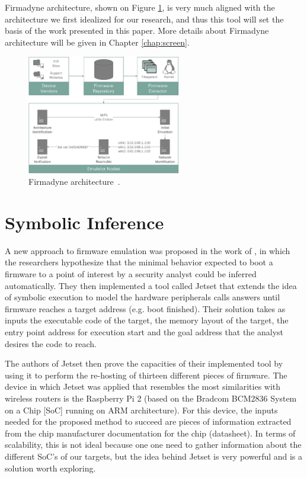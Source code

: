 Firmadyne architecture, shown on Figure \ref{fig:firmadyne}, is very much aligned with the architecture we first idealized for our research, and thus this tool will set the basis of the work presented in this paper. More details about Firmadyne architecture will be given in Chapter \ref{chap:screen}.

\begin{figure}[H]
    \centering
    \includegraphics[width=0.6\textwidth]{figs/firmadyne.png}
    \caption{Firmadyne architecture~\cite{firmadyne}.}
    \label{fig:firmadyne}
\end{figure}

\section{Symbolic Inference}

A new approach to firmware emulation was proposed in the work of \cite{jetset}, in which the researchers hypothesize that the minimal behavior expected to boot a firmware to a point of interest by a security analyst could be inferred automatically. They then implemented a tool called Jetset that extends the idea of symbolic execution to model the hardware peripherals calls answers until firmware reaches a target address (e.g. boot finished). Their solution takes as inputs the executable code of the target, the memory layout of the target, the entry point address for execution start and the goal address that the analyst desires the code to reach.

The authors of Jetset then prove the capacities of their implemented tool by using it to perform the re-hosting of thirteen different pieces of firmware. The device in which Jetset was applied that resembles the most similarities with wireless routers is the Raspberry Pi 2 (based on the Bradcom BCM2836 System on a Chip [SoC] running on ARM architecture). For this device, the inputs needed for the proposed method to succeed are pieces of information extracted from the chip manufacturer documentation for the chip (datasheet). In terms of scalability, this is not ideal because one one need to gather information about the different SoC's of our targets, but the idea behind Jetset is very powerful and is a solution worth exploring.

